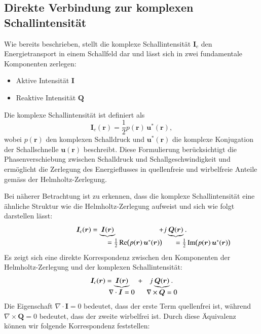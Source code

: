 \subsection{Direkte Verbindung zur komplexen Schallintensität
\label{helmholtz:subsection:Zerlegung_Schallschnelle}}
Wie bereits beschrieben, stellt die komplexe Schallintensität
$\boldsymbol{I}_c$ den Energietransport in einem Schallfeld dar und
lässt sich in zwei fundamentale Komponenten zerlegen:
\begin{itemize}
\item Aktive Intensität $\boldsymbol{I}$
\item Reaktive Intensität $\boldsymbol{Q}$
\end{itemize}
Die komplexe Schallintensität ist definiert als
\begin{equation}
\boldsymbol{I}_c (\boldsymbol{r})
=
\frac{1}{2} p(\boldsymbol{r}) \, \boldsymbol{u}^{*}(\boldsymbol{r}),
\end{equation}
wobei $p(\boldsymbol{r})$ den komplexen Schalldruck und
%
$\boldsymbol{u}^{*}(\boldsymbol{r})$ die komplexe Konjugation der
Schallschnelle $\boldsymbol{u}(\boldsymbol{r})$ beschreibt.
Diese
Formulierung berücksichtigt die Phasenverschiebung zwischen Schalldruck
und Schallgeschwindigkeit und ermöglicht die Zerlegung des
Energie\-flusses in quellenfreie und wirbelfreie Anteile gemäss der
Helmholtz-Zerlegung.
 
Bei näherer Betrachtung ist zu erkennen, dass die komplexe
Schallintensität eine ähnliche Struktur wie die Helmholtz-Zerlegung
aufweist und sich wie folgt darstellen lässt:
\begin{equation}
\boldsymbol{I}_c (\boldsymbol{r})
=
\underbrace{
\boldsymbol{I}(\boldsymbol{r})
}_{\mathstrut
\rlap{$
=\textstyle\frac{1}{2}
\operatorname{Re} \bigl( p(\boldsymbol{r})\, \boldsymbol{u}^*(\boldsymbol{r}) \bigr)
$}
}
\qquad\qquad
\qquad
+
j\underbrace{
\boldsymbol{Q}(\boldsymbol{r})
}_{\mathstrut
\rlap{$\textstyle
=\frac{1}{2}
\operatorname{Im} \bigl( p(\boldsymbol{r})\, \boldsymbol{u}^*(\boldsymbol{r}) \bigr)
$}}.
\end{equation}
Es zeigt sich eine direkte Korrespondenz zwischen den Komponenten der Helmholtz-Zerlegung und der komplexen Schallintensität:
\begin{equation}
\boldsymbol{I}_c (\boldsymbol{r})
=
\underbrace{
\boldsymbol{I}(\boldsymbol{r})
}_{
\clap{$\displaystyle\nabla \cdot \boldsymbol{I} = 0$}
}
\quad
+
\quad
j
\underbrace{
\boldsymbol{Q}(\boldsymbol{r})
}_{
\clap{$\displaystyle\nabla \times \boldsymbol{Q} = 0$}
}.
\end{equation}
Die Eigenschaft $\nabla\cdot\boldsymbol{I}=0$ bedeutet,
dass der erste Term quellenfrei ist, während $\nabla\times\boldsymbol{Q}=0$
bedeutet, dass der zweite wirbelfrei ist.
Durch diese Äquivalenz können wir folgende Korrespondenz feststellen:
 
